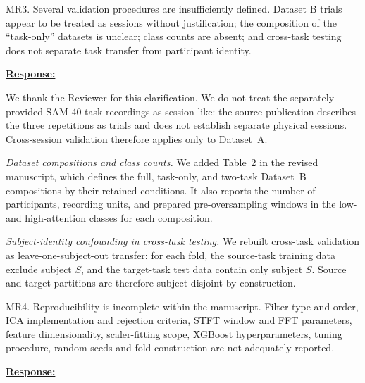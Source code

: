 \documentclass{article}
\begin{document}
\vspace{0.3cm}


\begin{cmt}{}{}

MR3. Several validation procedures are insufficiently defined. Dataset B
trials appear to be treated as sessions without justification; the
composition of the ``task-only'' datasets is unclear; class counts are
absent; and cross-task testing does not separate task transfer from
participant identity.

\end{cmt}
\vspace{0.1cm}
\noindent
\underline{\textbf{Response:}}
\vspace{0.2cm}

We thank the Reviewer for this clarification. We do not treat the separately
provided SAM-40 task recordings as session-like: the source publication
describes the three repetitions as trials and does not establish separate
physical sessions. Cross-session validation therefore applies only to
Dataset~A.

\emph{Dataset compositions and class counts.} We added
Table~2 in the revised manuscript, which defines the full, task-only, and
two-task Dataset~B compositions by their retained conditions. It also reports
the number of participants, recording units, and prepared pre-oversampling
windows in the low- and high-attention classes for each composition.

\emph{Subject-identity confounding in cross-task testing.} We rebuilt
cross-task validation as leave-one-subject-out transfer: for each fold, the
source-task training data exclude subject $S$, and the target-task test data
contain only subject $S$. Source and target partitions are therefore
subject-disjoint by construction.

\vspace{0.3cm}


\begin{cmt}{}{}

MR4. Reproducibility is incomplete within the manuscript. Filter type and order,
ICA implementation and rejection criteria, STFT window and FFT parameters,
feature dimensionality, scaler-fitting scope, XGBoost hyperparameters, tuning
procedure, random seeds and fold construction are not adequately reported.

\end{cmt}
\vspace{0.1cm}
\noindent
\underline{\textbf{Response:}}
\vspace{0.2cm}
\end{document}
